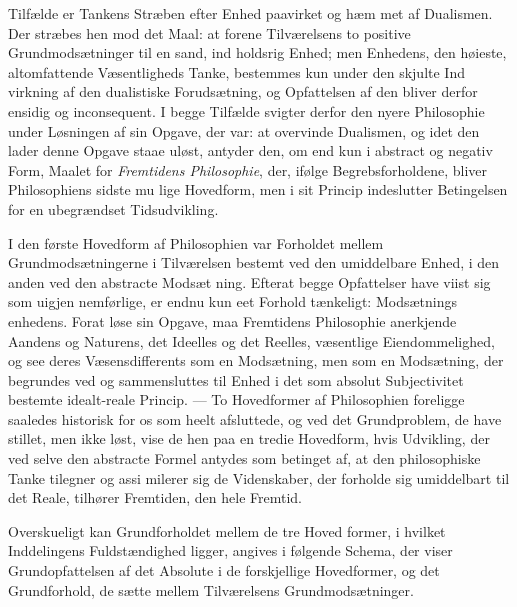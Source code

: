 \documentclass[12pt,a4paper]{book}
\begin{document}
Tilfælde er Tankens Stræben efter Enhed paavirket og hæm\-%
met af Dualismen. Der stræbes hen mod det Maal: at forene
Tilværelsens to positive Grundmodsætninger til en sand, ind\-%
holdsrig Enhed; men Enhedens, den høieste, altomfattende
Væsentligheds Tanke, bestemmes kun under den skjulte Ind\-%
virkning af den dualistiske Forudsætning, og Opfattelsen af
den bliver derfor ensidig og inconsequent. I begge Tilfælde
svigter derfor den nyere Philosophie under Løsningen af sin
Opgave, der var: at overvinde Dualismen, og idet den lader
denne Opgave staae uløst, antyder den, om end kun i abstract
og negativ Form, Maalet for \emph{Fremtidens Philosophie},
der, ifølge Begrebsforholdene, bliver Philosophiens sidste mu\-%
lige Hovedform, men i sit Princip indeslutter Betingelsen for
en ubegrændset Tidsudvikling.

I den første Hovedform af Philosophien var Forholdet
mellem Grundmodsætningerne i Tilværelsen bestemt ved den
umiddelbare Enhed, i den anden ved den abstracte Modsæt\-%
ning. Efterat begge Opfattelser have viist sig som uigjen\-%
nemførlige, er endnu kun eet Forhold tænkeligt: Modsætnings\-%
enhedens. Forat løse sin Opgave, maa Fremtidens Philosophie
anerkjende Aandens og Naturens, det Ideelles og det Reelles,
væsentlige Eiendommelighed, og see deres Væsensdifferents som
en Modsætning, men som en Modsætning, der begrundes ved
og sammensluttes til Enhed i det som absolut Subjectivitet
bestemte idealt-reale Princip. ---
To Hovedformer af Philosophien foreligge saaledes historisk
for os som heelt afsluttede, og ved det Grundproblem, de have
stillet, men ikke løst, vise de hen paa en tredie Hovedform,
hvis Udvikling, der ved selve den abstracte Formel antydes
som betinget af, at den philosophiske Tanke tilegner og assi\-%
milerer sig de Videnskaber, der forholde sig umiddelbart til
det Reale, tilhører Fremtiden, den hele Fremtid.

Overskueligt kan Grundforholdet mellem de tre Hoved\-%
former, i hvilket Inddelingens Fuldstændighed ligger, angives
i følgende Schema, der viser Grundopfattelsen af det Absolute
i de forskjellige Hovedformer, og det Grundforhold, de sætte
mellem Tilværelsens Grundmodsætninger.
\end{document}
